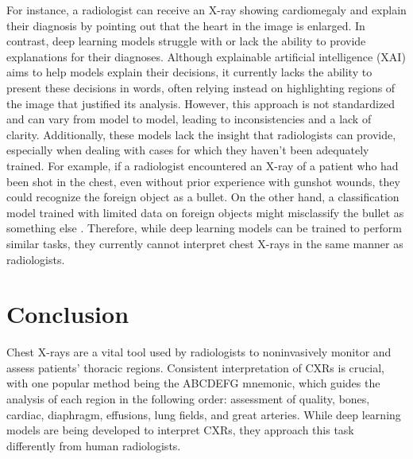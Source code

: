 \documentclass[10pt,twocolumn,letterpaper]{article}
\begin{document}
For instance, a radiologist can receive an X-ray showing cardiomegaly and explain their diagnosis by pointing out that the heart in the image is enlarged. In contrast, deep learning models struggle with or lack the ability to provide explanations for their diagnoses. Although explainable artificial intelligence (XAI) aims to help models explain their decisions, it currently lacks the ability to present these decisions in words, often relying instead on highlighting regions of the image that justified its analysis\cite{jimaging10080176}. However, this approach is not standardized and can vary from model to model, leading to inconsistencies and a lack of clarity. Additionally, these models lack the insight that radiologists can provide, especially when dealing with cases for which they haven't been adequately trained. For example, if a radiologist encountered an X-ray of a patient who had been shot in the chest, even without prior experience with gunshot wounds, they could recognize the foreign object as a bullet. On the other hand, a classification model trained with limited data on foreign objects might misclassify the bullet as something else \cite{jimaging10080176}. Therefore, while deep learning models can be trained to perform similar tasks, they currently cannot interpret chest X-rays in the same manner as radiologists.

\section{Conclusion}
Chest X-rays are a vital tool used by radiologists to noninvasively monitor and assess patients' thoracic regions. Consistent interpretation of CXRs is crucial, with one popular method being the ABCDEFG mnemonic, which guides the analysis of each region in the following order: assessment of quality, bones, cardiac, diaphragm, effusions, lung fields, and great arteries. While deep learning models are being developed to interpret CXRs, they approach this task differently from human radiologists.
{\small


}
\end{document}

